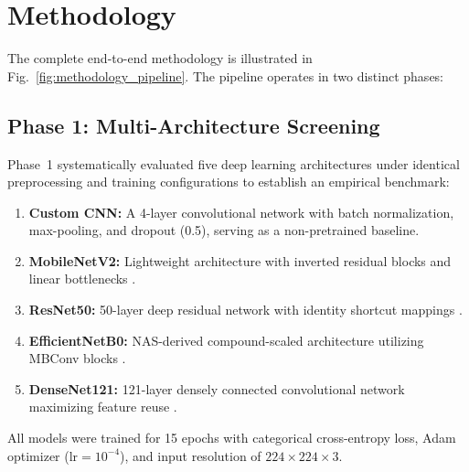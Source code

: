\documentclass[conference]{IEEEtran}
\begin{document}
\section{Methodology}
The complete end-to-end methodology is illustrated in Fig.~\ref{fig:methodology_pipeline}. The pipeline operates in two distinct phases:

\subsection{Phase 1: Multi-Architecture Screening}
Phase~1 systematically evaluated five deep learning architectures under identical preprocessing and training configurations to establish an empirical benchmark:
\begin{enumerate}
    \item \textbf{Custom CNN:} A 4-layer convolutional network with batch normalization, max-pooling, and dropout (0.5), serving as a non-pretrained baseline.
    \item \textbf{MobileNetV2:} Lightweight architecture with inverted residual blocks and linear bottlenecks \cite{sandler2018mobilenetv2}.
    \item \textbf{ResNet50:} 50-layer deep residual network with identity shortcut mappings \cite{he2016deep}.
    \item \textbf{EfficientNetB0:} NAS-derived compound-scaled architecture utilizing MBConv blocks \cite{tan2019efficientnet}.
    \item \textbf{DenseNet121:} 121-layer densely connected convolutional network maximizing feature reuse \cite{huang2017densely}.
\end{enumerate}

All models were trained for 15 epochs with categorical cross-entropy loss, Adam optimizer ($\text{lr}=10^{-4}$), and input resolution of $224 \times 224 \times 3$.
\end{document}
